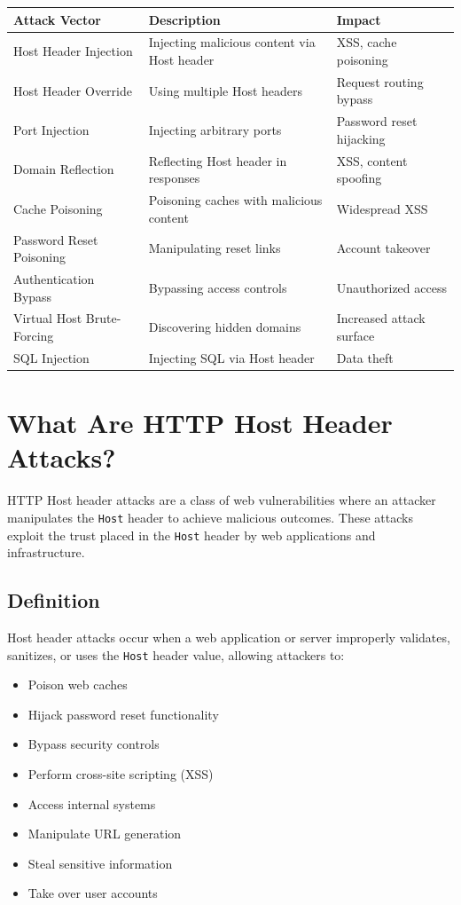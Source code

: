 \documentclass[12pt,a4paper]{article}
\begin{document}
\begin{longtable}{|p{4.5cm}|p{8cm}|p{4.5cm}|}
    \hline
    \textbf{Attack Vector} & \textbf{Description} & \textbf{Impact} \\
    \hline
    Host Header Injection & Injecting malicious content via Host header & XSS, cache poisoning \\
    \hline
    Host Header Override & Using multiple Host headers & Request routing bypass \\
    \hline
    Port Injection & Injecting arbitrary ports & Password reset hijacking \\
    \hline
    Domain Reflection & Reflecting Host header in responses & XSS, content spoofing \\
    \hline
    Cache Poisoning & Poisoning caches with malicious content & Widespread XSS \\
    \hline
    Password Reset Poisoning & Manipulating reset links & Account takeover \\
    \hline
    Authentication Bypass & Bypassing access controls & Unauthorized access \\
    \hline
    Virtual Host Brute-Forcing & Discovering hidden domains & Increased attack surface \\
    \hline
    SQL Injection & Injecting SQL via Host header & Data theft \\
    \hline
\end{longtable}

\section{What Are HTTP Host Header Attacks?}

HTTP Host header attacks are a class of web vulnerabilities where an attacker manipulates the \texttt{Host} header to achieve malicious outcomes. These attacks exploit the trust placed in the \texttt{Host} header by web applications and infrastructure.

\subsection{Definition}
Host header attacks occur when a web application or server improperly validates, sanitizes, or uses the \texttt{Host} header value, allowing attackers to:
\begin{itemize}
    \item Poison web caches
    \item Hijack password reset functionality
    \item Bypass security controls
    \item Perform cross-site scripting (XSS)
    \item Access internal systems
    \item Manipulate URL generation
    \item Steal sensitive information
    \item Take over user accounts
\end{itemize}
\end{document}

